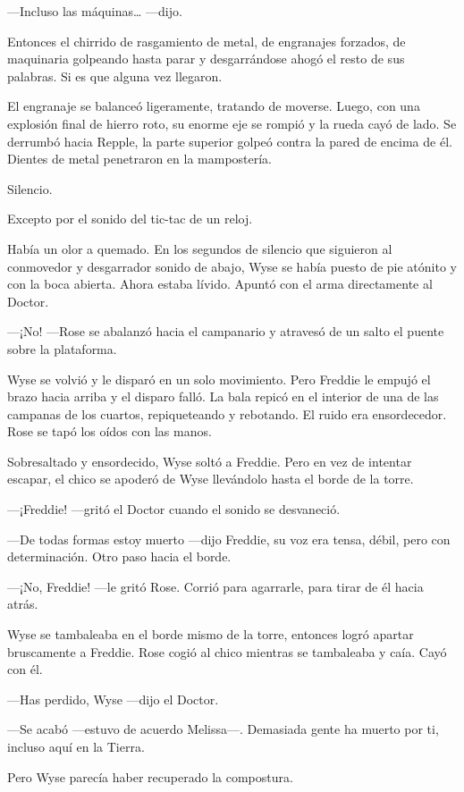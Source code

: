 {---Incluso las máquinas\ldots{} ---dijo.}

{Entonces el chirrido de rasgamiento de metal, de engranajes forzados,
	de maquinaria golpeando hasta parar y desgarrándose ahogó el resto de
sus palabras. Si es que alguna vez llegaron.}

{El engranaje se balanceó ligeramente, tratando de moverse. Luego, con
	una explosión final de hierro roto, su enorme eje se rompió y la rueda
	cayó de lado. Se derrumbó hacia Repple, la parte superior golpeó contra
	la pared de encima de él. Dientes de metal penetraron en la
mampostería.}

{Silencio.}

{Excepto por el sonido del tic-tac de un reloj.}

{Había un olor a quemado. En los segundos de silencio que siguieron al
	conmovedor y desgarrador sonido de abajo, Wyse se había puesto de pie
	atónito y con la boca abierta. Ahora estaba lívido. Apuntó con el arma
directamente al Doctor.}

{---¡No! ---Rose se abalanzó hacia el campanario y atravesó de un salto
el puente sobre la plataforma.}

{Wyse se volvió y le disparó en un solo movimiento. Pero Freddie le
	empujó el brazo hacia arriba y el disparo falló. La bala repicó en el
	interior de una de las campanas de los cuartos, repiqueteando y
	rebotando. El ruido era ensordecedor. Rose se tapó los oídos con las
manos.}

{Sobresaltado y ensordecido, Wyse soltó a Freddie. Pero en vez de
	intentar escapar, el chico se apoderó de Wyse llevándolo hasta el borde
de la torre.}

{---¡Freddie! ---gritó el Doctor cuando el sonido se desvaneció.}

{---De todas formas estoy muerto ---dijo Freddie, su voz era tensa,
débil, pero con determinación. Otro paso hacia el borde.}

{---¡No, Freddie! ---le gritó Rose. Corrió para agarrarle, para tirar de
él hacia atrás.}

{Wyse se tambaleaba en el borde mismo de la torre, entonces logró
	apartar bruscamente a Freddie. Rose cogió al chico mientras se
tambaleaba y caía. Cayó con él.}

{---Has perdido, Wyse ---dijo el Doctor.}

{---Se acabó ---estuvo de acuerdo Melissa---. Demasiada gente ha muerto
por ti, incluso aquí en la Tierra.}

{Pero Wyse parecía haber recuperado la compostura.}

